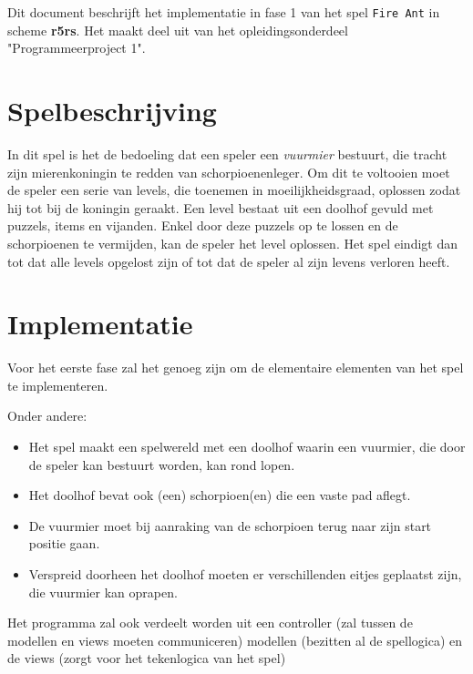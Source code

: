 Dit document beschrijft het implementatie in fase 1 van het spel \texttt{Fire Ant} in scheme \textbf{r5rs}.
Het maakt deel uit van het opleidingsonderdeel "Programmeerproject 1".

\section{Spelbeschrijving}
In dit spel is het de bedoeling dat een speler een \textit{vuurmier} bestuurt,
die tracht zijn mierenkoningin te redden van schorpioenenleger.
Om dit te voltooien moet de speler een serie van levels, die toenemen in moeilijkheidsgraad,
oplossen zodat hij tot bij de koningin geraakt.
Een level bestaat uit een doolhof gevuld met puzzels, items en vijanden.
Enkel door deze puzzels op te lossen en de schorpioenen te vermijden, kan de speler het level oplossen.
Het spel eindigt dan tot dat alle levels opgelost zijn of tot dat de speler al zijn levens verloren heeft.

\section{Implementatie}
Voor het eerste fase zal het genoeg zijn om de elementaire elementen van het spel te implementeren.

Onder andere:
\begin{itemize}
	\item Het spel maakt een spelwereld met een doolhof waarin een vuurmier, die door de speler kan bestuurt worden, kan rond lopen.
	\item Het doolhof bevat ook (een) schorpioen(en) die een vaste pad aflegt.
	\item	De vuurmier moet bij aanraking van de schorpioen terug naar zijn start positie gaan.
	\item Verspreid doorheen het doolhof moeten er verschillenden eitjes geplaatst zijn,
		die vuurmier kan oprapen.
\end{itemize}

Het programma zal ook verdeelt worden uit
een controller (zal tussen de modellen en views moeten communiceren)
modellen (bezitten al de spellogica)
en de views (zorgt voor het tekenlogica van het spel)

